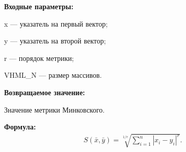 \textbf{Входные параметры:}
 
x --- указатель на первый вектор;
 
y --- указатель на второй вектор;

r --- порядок метрики;
 
VHML\_N --- размер массивов.

\textbf{Возвращаемое значение:}
 
Значение метрики Минковского.

\textbf{Формула:}
\begin{eqnarray*}
S\left( \bar{x}, \bar{y}\right)=\sqrt[1/r]{\sum_{i=1}^n {\left| x_i-y_i \right|}^r}   .
\end{eqnarray*}